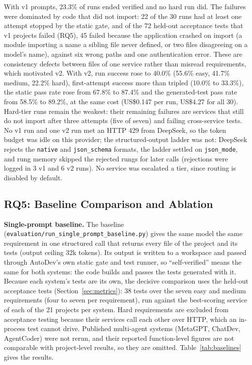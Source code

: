 \documentclass[conference,letterpaper]{IEEEtran}
\begin{document}
With v1 prompts, 23.3\% of runs ended verified and no hard run did. The failures
were dominated by code that did not import: 22 of the 30 runs had at least one
attempt stopped by the static gate, and of the 72 held-out acceptance tests that
v1 projects failed (RQ5), 45 failed because the application crashed on import
(a module importing a name a sibling file never defined, or two files
disagreeing on a model's name), against six wrong paths and one authentication
error. These are consistency defects between files
of one service rather than misread requirements, which motivated v2. With v2,
run success rose to 40.0\% (55.6\% easy, 41.7\% medium, 22.2\% hard),
first-attempt success more than tripled (10.0\% to 33.3\%), the static pass rate
rose from 67.8\% to 87.4\% and the generated-test pass rate from 58.5\% to
89.2\%, at the same cost (US\$0.147 per run, US\$4.27 for all 30). Hard-tier runs
remain the weakest: their remaining failures are services that still do not
import after three attempts (five of seven) and failing cross-service tests.
No v1 run and one v2 run met an HTTP 429 from DeepSeek, so the token budget
was idle on this provider; the structured-output ladder was not: DeepSeek
rejects the \texttt{native} and \texttt{json\_schema} formats, the ladder settled
on \texttt{json\_mode}, and rung memory skipped the rejected rungs for later calls
(rejections were logged in 3 v1 and 6 v2 runs). No service was escalated a tier,
since routing is disabled by default.

\subsection{RQ5: Baseline Comparison and Ablation}
\textbf{Single-prompt baseline.} The baseline
(\texttt{evaluation/\allowbreak run\_single\_prompt\_baseline.py}) gives the same
model the same requirement in one structured call that returns every file of the
project and its tests (output ceiling 32k tokens). Its output is written to a
workspace and passed through AutoDev's own static gate and test runner, so
``self-verified'' means the same for both systems: the code builds and passes the
tests generated with it. Because each system's tests are its own, the decisive
comparison uses the held-out acceptance tests (Section~\ref{sec:metrics}): 38
tests over the seven easy and medium requirements (four to seven per
requirement), run against the best-scoring service of each of the 21 projects per
system. Hard requirements are excluded from acceptance testing because their
services call each other over HTTP, which an in-process test cannot drive.
Published multi-agent systems (MetaGPT, ChatDev, AgentCoder) were not rerun, and
their reported function-level figures are not comparable with project-level
results, so they are omitted. Table~\ref{tab:baselines} gives the results.
\end{document}
